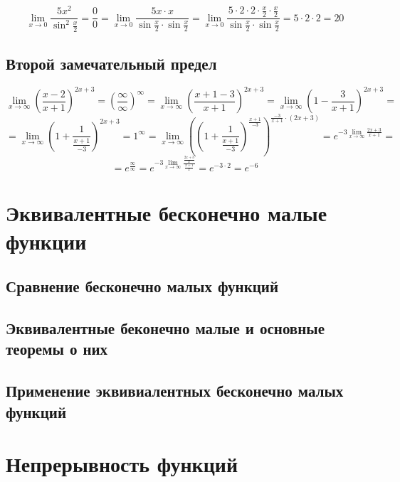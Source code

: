 \documentclass[14pt]{extreport}
\begin{document}
\begin{example}
$$\lim\limits_{x\to 0}\frac{5x^2}{\sin^2\frac{x}{2}}=\frac{0}{0}=\lim\limits_{x\to 0}\frac{5x\cdot x}{\sin\frac{x}{2}\cdot\sin\frac{x}{2}}=\lim\limits_{x\to 0}\frac{5\cdot2\cdot2\cdot\frac{x}{2}\cdot\frac{x}{2}}{\sin\frac{x}{2}\cdot\sin\frac{x}{2}}=5\cdot2\cdot2=20$$
\end{example}


\section{Второй замечательный предел}
\begin{example}
$$\lim\limits_{x\to\infty}\left(\frac{x-2}{x+1}\right)^{2x+3}=\left(\frac{\infty}{\infty}\right)^\infty= \lim\limits_{x\to\infty}\left(\frac{x+1-3}{x+1}\right)^{2x+3}=\lim\limits_{x\to\infty}\left(1-\frac{3}{x+1}\right)^{2x+3}=$$ $$=\lim\limits_{x\to\infty}\left(1+\frac{1}{\frac{x+1}{-3}}\right)^{2x+3}=1^\infty=\lim\limits_{x\to\infty}\left(\left(1+\frac{1}{\frac{x+1}{-3}}\right)^{\frac{x+1}{-3}}\right)^{\frac{-3}{x+1}\cdot(2x+3)}=e^{-3\lim\limits_{x\to\infty}\frac{2x+3}{x+1}}=$$ $$=e^{\frac{\infty}{\infty}}=e^{-3\lim\limits_{x\to\infty}\frac{\frac{2x+3}{x}}{\frac{x+1}{x}}}=e^{-3\cdot2}=e^{-6}$$
\end{example}


\chapter{Эквивалентные бесконечно малые функции}

\section{Сравнение бесконечно малых функций}

\section{Эквивалентные беконечно малые и основные теоремы о них}

\section{Применение эквивиалентных бесконечно малых функций}



\chapter{Непрерывность функций}
\end{document}

